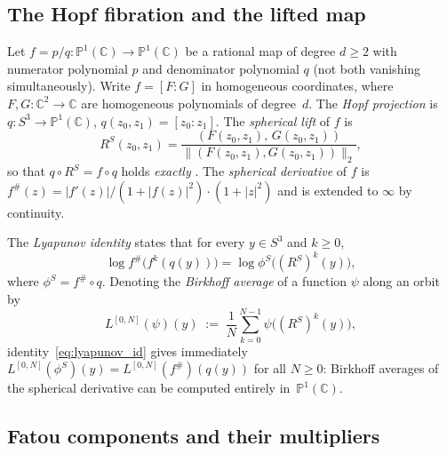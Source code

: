 \documentclass[12pt,a4paper]{article}
\newcommand{\Pone}{\mathbb{P}^1(\mathbb{C})}
\newcommand{\Sthree}{S^3}
\newcommand{\RS}{R^S}         %
\newcommand{\fsh}{f^\#}       %
\newcommand{\Lbirk}{L^{[0,N]}}
\newcommand{\CC}{\mathbb{C}}
\newcommand{\qmap}{q}         %
\begin{document}
\subsection{The Hopf fibration and the lifted map}
\label{ssec:hopf}

Let $f = p/q\colon\Pone\to\Pone$ be a rational map of degree $d\ge 2$
with numerator polynomial $p$ and denominator polynomial $q$ (not both
vanishing simultaneously).
Write $f = [F:G]$ in homogeneous coordinates, where $F,G\colon\CC^2\to\CC$
are homogeneous polynomials of degree~$d$.
The \emph{Hopf projection} is $\qmap\colon\Sthree\to\Pone$,
$\qmap(z_0,z_1) = [z_0:z_1]$.
The \emph{spherical lift} of $f$ is
\begin{equation}
  \RS(z_0,z_1) = \frac{(F(z_0,z_1),\,G(z_0,z_1))}%
                      {\|(F(z_0,z_1),G(z_0,z_1))\|_2},
\end{equation}
so that $\qmap\circ\RS = f\circ\qmap$ holds \emph{exactly} \cite{Alvarez2023}.
The \emph{spherical derivative} of $f$ is
$\fsh(z) = |f'(z)|/(1+|f(z)|^2)\cdot(1+|z|^2)$
and is extended to $\infty$ by continuity.

The \emph{Lyapunov identity} \cite{FatouHopf2026} states that for every
$y\in\Sthree$ and $k\ge 0$,
\begin{equation}\label{eq:lyapunov_id}
  \log\fsh\!\bigl(f^k(\qmap(y))\bigr)
  = \log\phi^S\!\bigl((\RS)^k(y)\bigr),
\end{equation}
where $\phi^S = \fsh\circ\qmap$.
Denoting the \emph{Birkhoff average} of a function $\psi$ along an orbit by
\begin{equation}\label{eq:birkhoff_avg}
  \Lbirk(\psi)(y)
  \;:=\; \frac{1}{N}\sum_{k=0}^{N-1}\psi\!\bigl((\RS)^k(y)\bigr),
\end{equation}
identity~\eqref{eq:lyapunov_id} gives immediately
$\Lbirk(\phi^S)(y) = \Lbirk(\fsh)(\qmap(y))$ for all $N\ge 0$:
Birkhoff averages of the spherical derivative can be computed
entirely in~$\Pone$.

\subsection{Fatou components and their multipliers}
\label{ssec:fatou}
\end{document}
